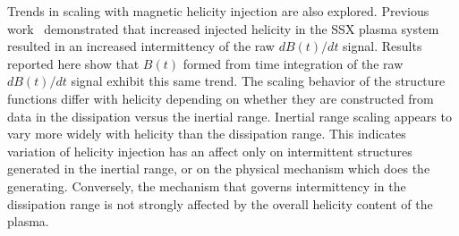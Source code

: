 \documentclass[preprint2]{aastex}
\begin{document}
Trends in scaling with magnetic helicity injection are also explored. Previous work~\citep{schaffner2014b} demonstrated that increased injected helicity in the SSX plasma system resulted in an increased intermittency of the raw $dB(t)/dt$ signal. Results reported here show that $B(t)$ formed from time integration of the raw $dB(t)/dt$ signal exhibit this same trend. The scaling behavior of the structure functions differ with helicity depending on whether they are constructed from data in the dissipation versus the inertial range. Inertial range scaling appears to vary more widely with helicity than the dissipation range. This indicates variation of helicity injection has an affect only on intermittent structures generated in the inertial range, or on the physical mechanism which does the generating. Conversely, the mechanism that governs intermittency in the dissipation range is not strongly affected by the overall helicity content of the plasma.
\end{document}
